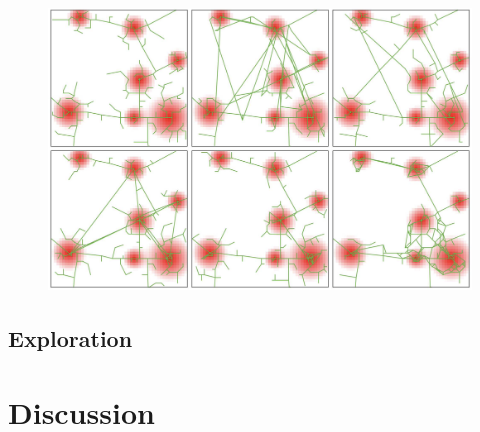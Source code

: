 \documentclass{article}
\begin{document}
  
\begin{figure}
\centering
\includegraphics[width=\linewidth]{figuresraw/example-alife18.png}
\end{figure}
  
  

\subsection{Exploration}

  
  


\section{Discussion}


\cite{molinero2020model}






\end{document}
